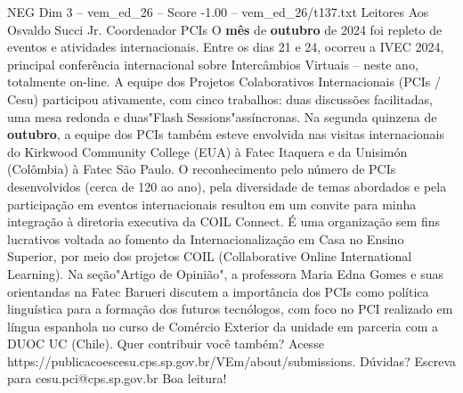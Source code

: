 \begin{textsample}{NEG Dim 3 – vem\_ed\_26 – Score -1.00 – vem\_ed\_26/t137.txt}  \label{ex:f3_neg_011}
Leitores Aos Osvaldo Succi Jr.
Coordenador PCIs O \textbf{mês} de \textbf{outubro} de 2024 foi repleto de eventos e atividades internacionais.
Entre os dias 21 e 24, ocorreu a IVEC 2024, principal conferência internacional sobre Intercâmbios Virtuais – neste ano, totalmente on-line.
A equipe dos Projetos Colaborativos Internacionais (PCIs / Cesu) participou ativamente, com cinco trabalhos: duas discussões facilitadas, uma mesa redonda e duas"Flash Sessions"assíncronas.
Na segunda quinzena de \textbf{outubro}, a equipe dos PCIs também esteve envolvida nas visitas internacionais do Kirkwood Community College (EUA) à Fatec Itaquera e da Unisimón (Colômbia) à Fatec São Paulo.
O reconhecimento pelo número de PCIs desenvolvidos (cerca de 120 ao ano), pela diversidade de temas abordados e pela participação em eventos internacionais resultou em um convite para minha integração à diretoria executiva da COIL Connect.
É uma organização sem fins lucrativos voltada ao fomento da Internacionalização em Casa no Ensino Superior, por meio dos projetos COIL (Collaborative Online International Learning).
Na seção"Artigo de Opinião", a professora Maria Edna Gomes e suas orientandas na Fatec Barueri discutem a importância dos PCIs como política linguística para a formação dos futuros tecnólogos, com foco no PCI realizado em língua espanhola no curso de Comércio Exterior da unidade em parceria com a DUOC UC (Chile).
Quer contribuir você também?
Acesse https://publicacoescesu.cps.sp.gov.br/VEm/about/submissions.
Dúvidas?
Escreva para cesu.pci@cps.sp.gov.br Boa leitura!

\end{textsample}
